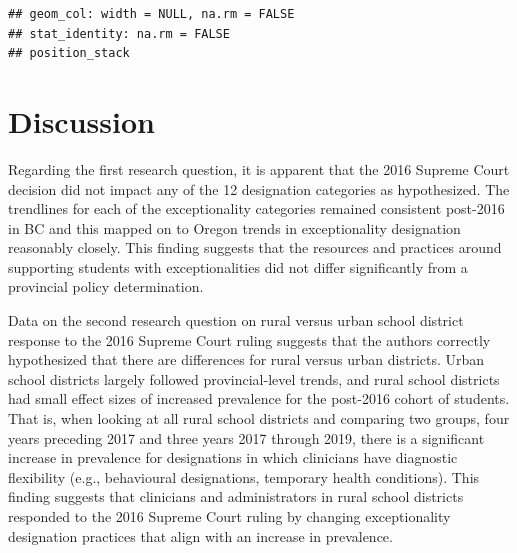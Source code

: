 \documentclass[
  english,
  man,floatsintext]{apa6}
\begin{document}
\begin{verbatim}
## geom_col: width = NULL, na.rm = FALSE
## stat_identity: na.rm = FALSE
## position_stack
\end{verbatim}

\hypertarget{discussion}{%
\section{Discussion}\label{discussion}}

Regarding the first research question, it is apparent that the 2016 Supreme Court decision did not impact any of the 12 designation categories as hypothesized. The trendlines for each of the exceptionality categories remained consistent post-2016 in BC and this mapped on to Oregon trends in exceptionality designation reasonably closely. This finding suggests that the resources and practices around supporting students with exceptionalities did not differ significantly from a provincial policy determination.

Data on the second research question on rural versus urban school district response to the 2016 Supreme Court ruling suggests that the authors correctly hypothesized that there are differences for rural versus urban districts. Urban school districts largely followed provincial-level trends, and rural school districts had small effect sizes of increased prevalence for the post-2016 cohort of students. That is, when looking at all rural school districts and comparing two groups, four years preceding 2017 and three years 2017 through 2019, there is a significant increase in prevalence for designations in which clinicians have diagnostic flexibility (e.g., behavioural designations, temporary health conditions). This finding suggests that clinicians and administrators in rural school districts responded to the 2016 Supreme Court ruling by changing exceptionality designation practices that align with an increase in prevalence.
\end{document}
